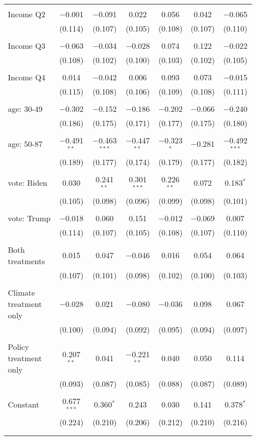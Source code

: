 \begin{tabular}{@{\extracolsep{5pt}}lcccccc}
  & & & & & & \\ 
 Income Q2 & $-$0.001 & $-$0.091 & 0.022 & 0.056 & 0.042 & $-$0.065 \\ 
  & (0.114) & (0.107) & (0.105) & (0.108) & (0.107) & (0.110) \\ 
  & & & & & & \\ 
 Income Q3 & $-$0.063 & $-$0.034 & $-$0.028 & 0.074 & 0.122 & $-$0.022 \\ 
  & (0.108) & (0.102) & (0.100) & (0.103) & (0.102) & (0.105) \\ 
  & & & & & & \\ 
 Income Q4 & 0.014 & $-$0.042 & 0.006 & 0.093 & 0.073 & $-$0.015 \\ 
  & (0.115) & (0.108) & (0.106) & (0.109) & (0.108) & (0.111) \\ 
  & & & & & & \\ 
 age: 30-49 & $-$0.302 & $-$0.152 & $-$0.186 & $-$0.202 & $-$0.066 & $-$0.240 \\ 
  & (0.186) & (0.175) & (0.171) & (0.177) & (0.175) & (0.180) \\ 
  & & & & & & \\ 
 age: 50-87 & $-$0.491$^{**}$ & $-$0.463$^{***}$ & $-$0.447$^{**}$ & $-$0.323$^{*}$ & $-$0.281 & $-$0.492$^{***}$ \\ 
  & (0.189) & (0.177) & (0.174) & (0.179) & (0.177) & (0.182) \\ 
  & & & & & & \\ 
 vote: Biden & 0.030 & 0.241$^{**}$ & 0.301$^{***}$ & 0.226$^{**}$ & 0.072 & 0.183$^{*}$ \\ 
  & (0.105) & (0.098) & (0.096) & (0.099) & (0.098) & (0.101) \\ 
  & & & & & & \\ 
 vote: Trump & $-$0.018 & 0.060 & 0.151 & $-$0.012 & $-$0.069 & 0.007 \\ 
  & (0.114) & (0.107) & (0.105) & (0.108) & (0.107) & (0.110) \\ 
  & & & & & & \\ 
 Both treatments & 0.015 & 0.047 & $-$0.046 & 0.016 & 0.054 & 0.064 \\ 
  & (0.107) & (0.101) & (0.098) & (0.102) & (0.100) & (0.103) \\ 
  & & & & & & \\ 
 Climate treatment only & $-$0.028 & 0.021 & $-$0.080 & $-$0.036 & 0.098 & 0.067 \\ 
  & (0.100) & (0.094) & (0.092) & (0.095) & (0.094) & (0.097) \\ 
  & & & & & & \\ 
 Policy treatment only & 0.207$^{**}$ & 0.041 & $-$0.221$^{**}$ & 0.040 & 0.050 & 0.114 \\ 
  & (0.093) & (0.087) & (0.085) & (0.088) & (0.087) & (0.089) \\ 
  & & & & & & \\ 
 Constant & 0.677$^{***}$ & 0.360$^{*}$ & 0.243 & 0.030 & 0.141 & 0.378$^{*}$ \\ 
  & (0.224) & (0.210) & (0.206) & (0.212) & (0.210) & (0.216) \\ 
  & & & & & & \\ 
\hline \\[-1.8ex] 


\end{tabular}
